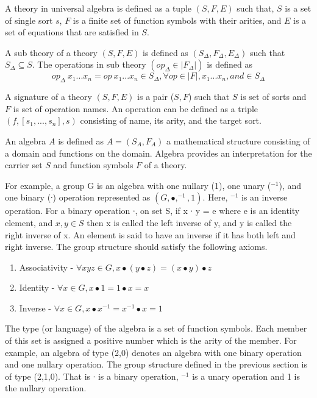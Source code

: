 A theory in universal algebra is defined as a tuple $(S,F,E)$ such that, $S$ is
a set of single sort $s$, $F$ is a finite set of function symbols with their
arities, and $E$ is a set of equations that are satisfied in $S$.

A sub theory of a theory $(S,F,E)$ is defined as $(S_\Delta,F_\Delta,E_\Delta)$
such that $S_\Delta \subseteq S$. The operations in sub theory $(op_\Delta \in
|F_\Delta|)$ is defined as
\[op_\Delta\ x_1...x_n = op\ x_1...x_n \in S_\Delta,\forall op \in
|F|,x_1...x_n, and \in S_\Delta \]  

A signature of a theory $(S,F,E)$ is a pair ($S,F$) such that $S$ is set of
sorts and $F$ is set of operation names. An operation can be defined as a triple
$(f,[s_1,...,s_n],s)$ consisting of name, its arity, and the target sort. 

An algebra $A$ is defined as $A = (S_A,F_A)$ a mathematical structure consisting
of a domain and functions on the domain. Algebra provides an interpretation for
the carrier set $S$ and function symbols $F$ of a theory.

For example, a group G is an algebra with one nullary (1), one unary
($^{-1}$), and one binary (∙) operation represented as $(G, ∙,
^{-1}, 1)$. Here, $^{-1}$ is an inverse operation.
For a binary operation ∙, on set S, if x ∙ y = e where e is an identity element,
and $x,y \in S$ then x is called the left inverse of y, and y is called the
right inverse of x. An element is said to have an inverse if it has both left
and right inverse. The group structure should satisfy the following axioms. 
\begin{enumerate}
\item Associativity - \( ∀ x y z \in G, x ∙ (y ∙ z) = (x ∙ y) ∙ z \)
\item Identity - \(∀ x \in G, x ∙ 1 = 1 ∙ x = x\)
\item Inverse - \( ∀ x \in G, x ∙ x ^{-1} =  x
^{-1} ∙ x = 1\)
\end{enumerate}

The type (or language) of the algebra is a set of function symbols. Each member
of this set is assigned a positive number which is the arity of the member. For
example, an algebra of type (2,0) denotes an algebra with one binary operation
and one nullary operation. The group structure defined in the previous section
is of type (2,1,0). That is ∙ is a binary operation, $^{-1}$ is a
unary operation and 1 is the nullary operation.

